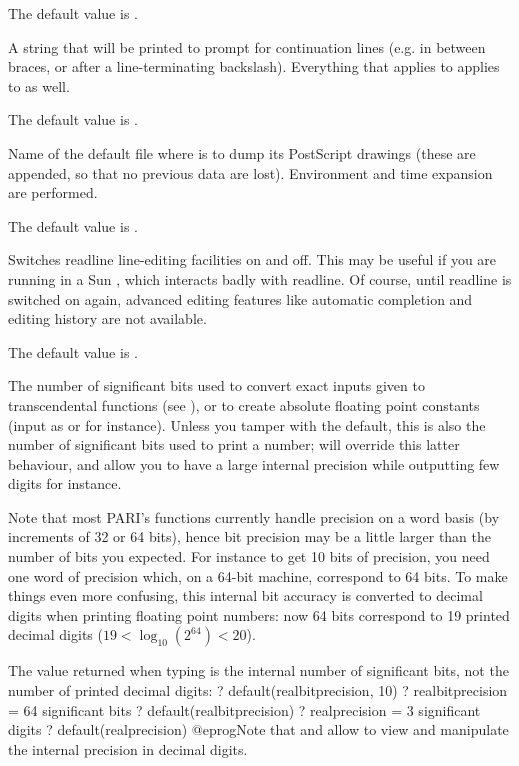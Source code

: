 {The default value is .

\label{se:def,prompt_cont}
A string that will be printed
to prompt for continuation lines (e.g. in between braces, or after a
line-terminating backslash). Everything that applies to 
applies to  as well.

The default value is .

\label{se:def,psfile}
Name of the default file where
 is to dump its PostScript drawings (these are appended, so that no
previous data are lost). Environment and time expansion are performed.

The default value is .

\label{se:def,readline}
Switches readline line-editing
facilities on and off. This may be useful if you are running  in a Sun
, which interacts badly with readline. Of course, until readline
is switched on again, advanced editing features like automatic completion
and editing history are not available.

The default value is .

\label{se:def,realbitprecision}
The number of significant bits used to convert exact inputs given to
transcendental functions (see ), or to create
absolute floating point constants (input as  or  for
instance). Unless you tamper with the  default, this is also
the number of significant bits used to print a  number;
 will override this latter behaviour, and allow you to have a
large internal precision while outputting few digits for instance.

Note that most PARI's functions currently handle precision on a word basis (by
increments of 32 or 64 bits), hence bit precision may be a little larger
than the number of bits you expected. For instance to get 10 bits of
precision, you need one word of precision which, on a 64-bit machine,
correspond to 64 bits. To make things even more confusing, this internal bit
accuracy is converted to decimal digits when printing floating point numbers:
now 64 bits correspond to 19 printed decimal digits
($19 <  \log_{10}(2^{64}) < 20$).

The value returned when typing  is the internal
number of significant bits, not the number of printed decimal digits:
\bprog
? default(realbitprecision, 10)
? \pb
      realbitprecision = 64 significant bits
? default(realbitprecision)
? \p
      realprecision = 3 significant digits
? default(realprecision)
@eprog\noindent Note that  and  allow
to view and manipulate the internal precision in decimal digits.

}
